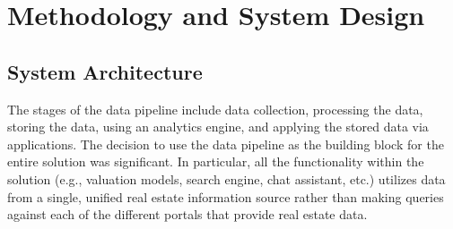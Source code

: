 \chapter{Methodology and System Design}

\section{System Architecture}

The stages of the data pipeline include data collection, processing the data, storing the data, using an analytics engine, and applying the stored data via applications. The decision to use the data pipeline as the building block for the entire solution was significant. In particular, all the functionality within the solution (e.g., valuation models, search engine, chat assistant, etc.) utilizes data from a single, unified real estate information source rather than making queries against each of the different portals that provide real estate data.


